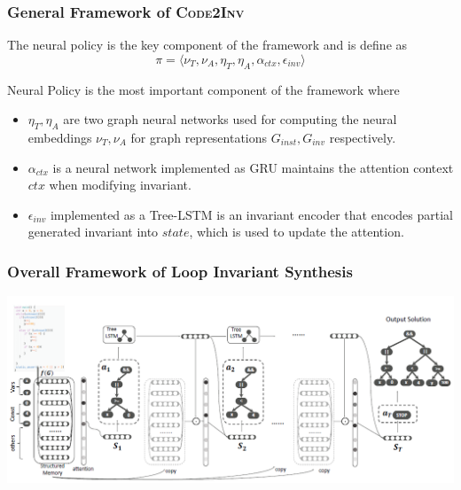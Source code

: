 \documentclass[11pt]{beamer}
\begin{document}
\begin{frame}\frametitle{General Framework of \textsc{Code2Inv}}
\begin{definition}
The neural policy is the key component of the framework and is define as 
\[\pi = \langle \nu_T, \nu_A, \eta_T, \eta_A, \alpha_{ctx}, \epsilon_{inv} \rangle \]

\end{definition}
Neural Policy is the most important component of the framework where 
\begin{itemize}
\item $\eta_T, \eta_A$ are two graph neural networks used for computing the neural embeddings  $\nu_T, \nu_A$ for graph representations  $G_{inst}, G_{inv}$ respectively.

\item $\alpha_{ctx}$ is a neural network implemented as GRU maintains the attention context $ctx$ when modifying invariant.

\item $\epsilon_{inv}$ implemented as a Tree-LSTM is an invariant encoder that encodes partial generated invariant into $state$, which is used to update the attention.
\end{itemize}



\end{frame}

\begin{frame}\frametitle{Overall Framework of Loop Invariant Synthesis}
\begin{center}
\includegraphics[scale = 0.39]{2.png}

\end{center}

\end{frame}
\end{document}
